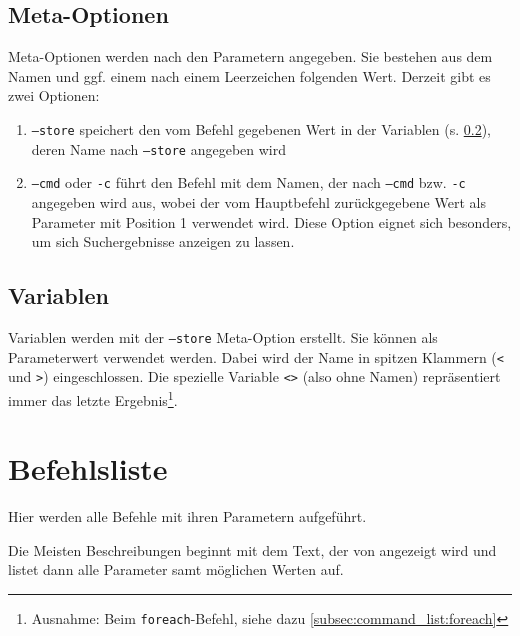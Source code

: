 
\subsection{Meta-Optionen}
\label{subsec:command_syntax_complete:meta_options}

Meta-Optionen werden nach den Parametern angegeben. Sie bestehen aus dem Namen und ggf. einem nach einem Leerzeichen folgenden Wert. Derzeit gibt es zwei Optionen:

\begin{enumerate}
\item \texttt{--store} speichert den vom Befehl gegebenen Wert in der Variablen (s. \ref{subsec:command_syntax_complete:variables}), deren Name nach \texttt{--store} angegeben wird
\item \texttt{--cmd} oder \texttt{-c} führt den Befehl mit dem Namen, der nach \texttt{--cmd} bzw. \texttt{-c} angegeben wird aus, wobei der vom Hauptbefehl zurückgegebene Wert als Parameter mit Position 1 verwendet wird. Diese Option eignet sich besonders, um sich Suchergebnisse anzeigen zu lassen.
\end{enumerate}

\subsection{Variablen}
\label{subsec:command_syntax_complete:variables}

Variablen werden mit der \texttt{--store} Meta-Option erstellt. Sie können als Parameterwert verwendet werden. Dabei wird der Name in spitzen Klammern (\texttt{<} und \texttt{>}) eingeschlossen. Die spezielle Variable \texttt{<>} (also ohne Namen) repräsentiert immer das letzte Ergebnis\footnote{Ausnahme: Beim \texttt{foreach}-Befehl, siehe dazu \ref{subsec:command_list:foreach}}.


\section{Befehlsliste}
\label{sec:command_list}

Hier werden alle Befehle mit ihren Parametern aufgeführt.

Die Meisten Beschreibungen beginnt mit dem Text, der von  angezeigt wird und listet dann alle Parameter samt möglichen Werten auf.

